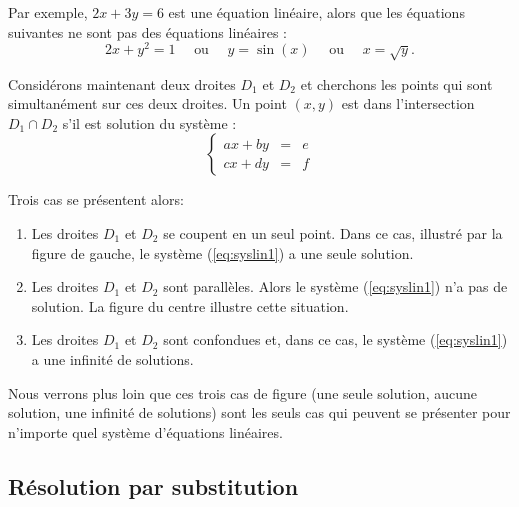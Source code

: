 \documentclass[class=report,crop=false]{standalone}
\begin{document}
Par exemple, $2x + 3y = 6$ est une équation linéaire, alors
que les équations suivantes ne sont pas des équations linéaires :
 $$ 2x + y^2 = 1 \quad \text { ou }  \quad y = \sin (x)  \quad \text { ou } \quad  x = \sqrt{y}.$$


\bigskip

Considérons maintenant deux droites $D_1$ et $D_2$ et cherchons les points qui
sont simultanément sur ces deux droites. Un point $(x,y)$ est dans l'intersection
$D_1 \cap D_2$ s'il est solution du système :
\begin{equation}
\left\{\begin{array}{rcl}
a x + b y & = & e\\
c x + d y & = & f
\end{array}\right.
\tag{$S$}
\label{eq:syslin1}
\end{equation}


Trois cas se présentent alors:
\begin{enumerate}
  \item Les droites $D_1$ et $D_2$ se coupent en un seul point.
Dans ce cas, illustré par la figure de gauche,
le système (\ref{eq:syslin1}) a une seule solution.


  \item Les droites $D_1$ et $D_2$ sont parallèles. Alors le système
  (\ref{eq:syslin1}) n'a pas de solution.
 La figure du centre illustre cette situation.


  \item Les droites $D_1$ et $D_2$ sont confondues et, dans ce cas,
  le système  (\ref{eq:syslin1}) a une infinité de solutions.
\end{enumerate}




Nous verrons plus loin que ces trois cas de figure (une seule solution,
aucune solution, une infinité de solutions)
sont les seuls cas qui peuvent se présenter pour n'importe quel système
d'équations linéaires.

\subsection{Résolution par substitution}
\end{document}
